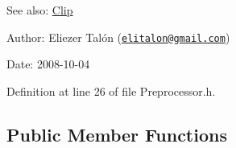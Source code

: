 \begin{Desc}
\item[See also:]\hyperlink{class_clip}{Clip}\end{Desc}
\begin{Desc}
\item[Author:]Eliezer Talón (\href{mailto:elitalon@gmail.com}{\tt elitalon@gmail.com}) \end{Desc}
\begin{Desc}
\item[Date:]2008-10-04 \end{Desc}


Definition at line 26 of file Preprocessor.h.\subsection*{Public Member Functions}
